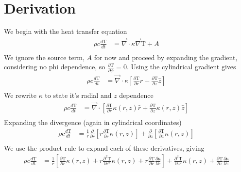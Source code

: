 \documentclass[12pt]{article}
\begin{document}
		\section{Derivation}
		We begin with the heat transfer equation
		\begin{equation}
		\begin{aligned}
		\rho c \frac{d\mathrm{T}}{dt} &= \vec\nabla \cdot \kappa \vec\nabla \mathrm{T} + A \\
		\end{aligned}
		\end{equation}
		We ignore the source term, $A$ for now and proceed by expanding the gradient, considering no phi dependence, so $\frac{\partial\mathrm{T}}{\partial\phi}=0$. Using the cylindrical gradient gives
		\begin{equation}
		\begin{aligned}
		\rho c \frac{d\mathrm{T}}{dt} &= \vec\nabla \cdot \kappa \left [  \frac{\partial\mathrm{T}}{\partial r}\hat r  + \frac{\partial\mathrm{T}}{\partial z}\hat z \right ] \\
		\end{aligned}
		\end{equation}
		We rewrite $\kappa$ to state it's radial and $z$ dependence
		\begin{equation}
		\begin{aligned}
		\rho c \frac{d\mathrm{T}}{dt} &= \vec\nabla \cdot \left [  \frac{\partial\mathrm{T}}{\partial r}\kappa(r, z) \hat r  + \frac{\partial\mathrm{T}}{\partial z}\kappa(r, z) \hat z \right ] \\
		\end{aligned}
		\end{equation}
		Expanding the divergence (again in cylindrical coordinates)
		\begin{equation}
		\begin{aligned}
		\rho c \frac{d\mathrm{T}}{dt} &= \frac{1}{r}\frac{\partial}{\partial r}  \left [ r \frac{\partial\mathrm{T}}{\partial r}\kappa(r, z) \right ]  + \frac{\partial}{\partial z} \left [ \frac{\partial\mathrm{T}}{\partial z}\kappa(r, z)  \right ] \\
		\end{aligned}
		\end{equation}
		We use the product rule to expand each of these derivatives, giving
		\begin{equation}
		\begin{aligned}
		\rho c \frac{d\mathrm{T}}{dt} &= \frac{1}{r} \left [ \frac{\partial\mathrm{T}}{\partial r}\kappa(r, z) + r\frac{\partial^2\mathrm{T}}{\partial r^2}\kappa(r, z)  + r\frac{\partial\mathrm{T}}{\partial r} \frac{\partial\mathrm{\kappa}}{\partial r} \right ] + \frac{\partial^2\mathrm{T}}{\partial z^2}\kappa(r, z) + \frac{\partial\mathrm{T}}{\partial z}\frac{\partial\mathrm{\kappa}}{\partial z} \\
		\end{aligned}
		\end{equation}
\end{document}
